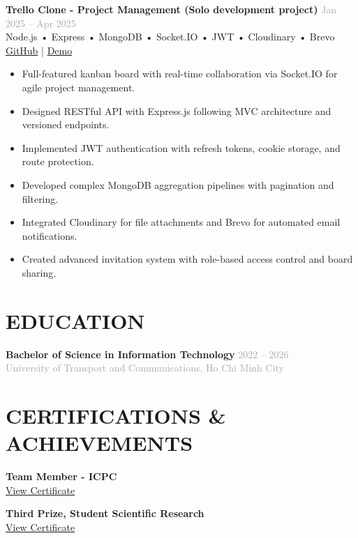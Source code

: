 \documentclass[10pt,a4paper]{article}
\newcommand{\projectitem}[5]{
    \noindent\begin{tcolorbox}[
        colback=white,
        colframe=lightgray,
        boxrule=0.3pt,
        arc=2pt,
        top=3pt,
        bottom=3pt,
        left=6pt,
        right=6pt
    ]
        \noindent\textbf{\color{primary}#1} \hfill \textcolor{darkgray}{\scriptsize#2}\\[1pt]
        {\small\color{secondary}#3}\\[1pt]
        {\scriptsize\color{darkgray}#4}\\[3pt]
        #5
    \end{tcolorbox}
}
\begin{document}
\vspace{3pt}

\projectitem{Trello Clone - Project Management (Solo development project) }{Jan 2025 -- Apr 2025}
    {Node.js • Express • MongoDB • Socket.IO • JWT • Cloudinary • Brevo}
    {\href{https://github.com/dungken}{\textcolor{secondary}{\faGithub* GitHub}} | \href{YOUR_YOUTUBE_DEMO_LINK}{\textcolor{secondary}{\faYoutube* Demo}}}
    {\begin{itemize}[leftmargin=12pt,itemsep=1pt,parsep=0pt,topsep=0pt,after=\vspace{-2pt},label={•}]
        \item Full-featured kanban board with real-time collaboration via Socket.IO for agile project management.
        \item Designed RESTful API with Express.js following MVC architecture and versioned endpoints.
        \item Implemented JWT authentication with refresh tokens, cookie storage, and route protection.
        \item Developed complex MongoDB aggregation pipelines with pagination and filtering.
        \item Integrated Cloudinary for file attachments and Brevo for automated email notifications.
        \item Created advanced invitation system with role-based access control and board sharing.
    \end{itemize}}

\vspace{6pt}

\section{EDUCATION}
\noindent\textbf{Bachelor of Science in Information Technology} \hfill \textcolor{darkgray}{\small 2022 -- 2026}\\[1pt]
\textcolor{darkgray}{\small University of Transport and Communications, Ho Chi Minh City}

\vspace{6pt}

\section{CERTIFICATIONS \& ACHIEVEMENTS}
\begin{minipage}[t]{0.5\textwidth}
    \textbf{\small Team Member - ICPC }\\[1pt]
    \href{https://github.com/dungken/MyResume/blob/master/Certificates/icpc.png}{\textcolor{secondary}{\scriptsize View Certificate}}
\end{minipage}%
\begin{minipage}[t]{0.5\textwidth}
    \textbf{\small Third Prize, Student Scientific Research }\\[1pt]
    \href{https://github.com/dungken/MyResume/blob/master/Certificates/nckh.png}{\textcolor{secondary}{\scriptsize View Certificate}}
\end{minipage}
\end{document}
